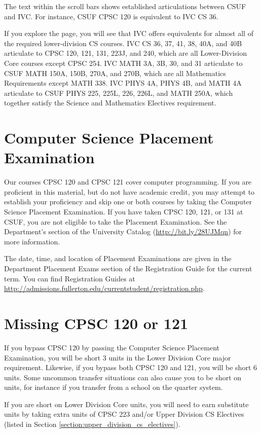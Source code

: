 \documentclass{book}
\newcommand{\CampusName}{CSUF}
\begin{document}
The text within the scroll bars shows established articulations between CSUF and IVC. For instance, CSUF CPSC 120 is equivalent to IVC CS 36.


If you explore the page, you will see that IVC offers equivalents for almost all of the required lower-division CS courses. IVC CS 36, 37, 41, 38, 40A, and 40B articulate to CPSC 120, 121, 131, 223J, and 240, which are all Lower-Division Core courses except CPSC 254. IVC MATH 3A, 3B, 30, and 31 articulate to CSUF MATH 150A, 150B, 270A, and 270B, which are all Mathematics Requirements except MATH 338. IVC PHYS 4A, PHYS 4B, and MATH 4A articulate to CSUF PHYS 225, 225L, 226, 226L, and MATH 250A, which together satisfy the Science and Mathematics Electives requirement.

\section{Computer Science Placement Examination}
\label{section:placement}
Our courses CPSC 120 and CPSC 121 cover computer programming. If you are
proficient in this material, but do not have academic credit, you may attempt
to establish your proficiency and skip one or both courses by taking the
Computer Science Placement Examination. If you have taken CPSC 120, 121, or 131
at \CampusName, you are not eligible to take the Placement Examination. See the Department's
section of the University Catalog (\url{http://bit.ly/28UJMqn}) for more information.

The date, time, and location of Placement Examinations are given in the Department Placement Exams section of the Registration Guide for the current term. You can find Registration Guides at \url{http://admissions.fullerton.edu/currentstudent/registration.php}.

\section{Missing CPSC 120 or 121}

If you bypass CPSC 120 by passing the Computer Science Placement Examination, you will be short 3 units in the Lower Division Core major requirement. Likewise, if you bypass both CPSC 120 and 121, you will be short 6 units. Some uncommon transfer situations can also cause you to be short on units, for instance if you transfer from a school on the quarter system.

If you are short on Lower Division Core units, you will need to earn substitute units by
taking extra units of CPSC 223 and/or Upper Division CS Electives (listed in Section
\ref{section:upper_division_cs_electives}).
\end{document}
